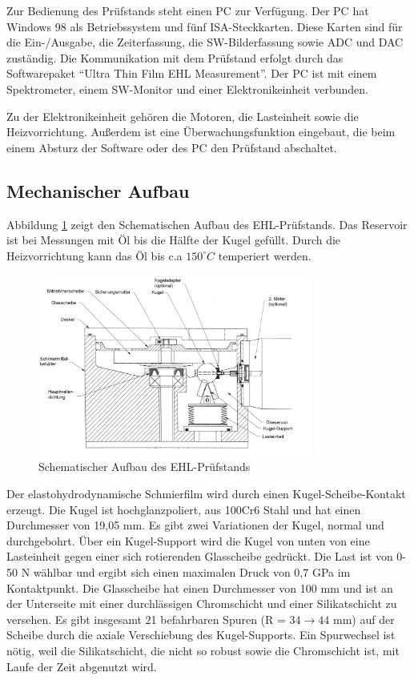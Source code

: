 Zur Bedienung des Prüfstands steht einen PC zur Verfügung.
Der PC hat Windows 98 als Betriebssystem und fünf ISA-Steckkarten.
Diese Karten sind für die Ein-/Ausgabe, die Zeiterfassung, die SW-Bilderfassung sowie ADC und DAC zuständig.
Die Kommunikation mit dem Prüfstand erfolgt durch das Softwarepaket ``Ultra Thin Film EHL Measurement''.
Der PC ist mit einem Spektrometer, einem SW-Monitor und einer Elektronikeinheit verbunden.

Zu der Elektronikeinheit gehören die Motoren, die Lasteinheit sowie die Heizvorrichtung.
Außerdem ist eine Überwachungsfunktion eingebaut, die beim einem Absturz der Software oder des PC den Prüfstand abschaltet.

\subsection{Mechanischer Aufbau}
\label{sub:mechanischer_aufbau}

Abbildung \ref{fig:ehl_aufbau} zeigt den Schematischen Aufbau des EHL-Prüfstands.
Das Reservoir ist bei Messungen mit Öl bis die Hälfte der Kugel gefüllt.
Durch die Heizvorrichtung kann das Öl bis c.a $150 ^\circ C$ temperiert werden.
\begin{figure}[htb]
    \centering
    \includegraphics[width=0.8\textwidth]{./images/ehd_pruefstand_aufbau.png}
    \caption{Schematischer Aufbau des EHL-Prüfstands \cite{ehl}}
    \label{fig:ehl_aufbau}
\end{figure}
%
Der elastohydrodynamische Schmierfilm wird durch einen Kugel-Scheibe-Kontakt erzeugt.
Die Kugel ist hochglanzpoliert, aus 100Cr6 Stahl und hat einen Durchmesser von 19,05 mm.
Es gibt zwei Variationen der Kugel, normal und durchgebohrt.
Über ein Kugel-Support wird die Kugel von unten von eine Lasteinheit gegen einer sich rotierenden Glasscheibe gedrückt.
Die Last ist von 0-50 N wählbar und ergibt sich einen maximalen Druck von 0,7 GPa im Kontaktpunkt.
Die Glasscheibe hat einen Durchmesser von 100 mm und ist an der Unterseite mit einer durchlässigen Chromschicht und einer Silikatschicht zu versehen.
Es gibt insgesamt 21 befahrbaren Spuren (R = $34 \rightarrow 44$ mm) auf der Scheibe durch die axiale Verschiebung des Kugel-Supports.
Ein Spurwechsel ist nötig, weil die Silikatschicht, die nicht so robust sowie die Chromschicht ist, mit Laufe der Zeit abgenutzt wird.

